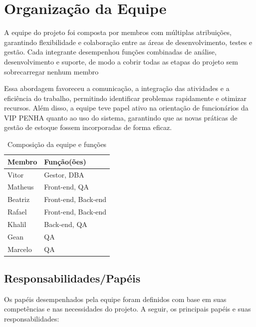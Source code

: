 \documentclass[
	12pt,				%
	openany,			%
	twoside,			%
	a4paper,			%
	english,			%
	brazil				%
	]{abntex2}
\begin{document}
\section{Organização da Equipe}

A equipe do projeto foi composta por membros com múltiplas atribuições, garantindo flexibilidade e colaboração entre as áreas de desenvolvimento, testes e gestão. Cada integrante desempenhou funções combinadas de análise, desenvolvimento e suporte, de modo a cobrir todas as etapas do projeto sem sobrecarregar nenhum membro

Essa abordagem favoreceu a comunicação, a integração das atividades e a eficiência do trabalho, permitindo identificar problemas rapidamente e otimizar recursos. Além disso, a equipe teve papel ativo na orientação de funcionários da VIP PENHA quanto ao uso do sistema, garantindo que as novas práticas de gestão de estoque fossem incorporadas de forma eficaz.

\begin{table}[htbp] 
\centering
\begin{tabular}{|l|l|}
\hline
\textbf{Membro} & \textbf{Função(ões)} \\ \hline
Vitor           & Gestor, DBA         \\ \hline
Matheus         & Front-end, QA         \\ \hline
Beatriz         & Front-end, Back-end   \\ \hline
Rafael          & Front-end, Back-end         \\ \hline
Khalil              & Back-end, QA          \\ \hline
Gean            & QA                    \\ \hline
Marcelo         & QA         \\ \hline
\end{tabular}
\caption{Composição da equipe e funções}
\end{table}


\subsection{Responsabilidades/Papéis}

Os papéis desempenhados pela equipe foram definidos com base em suas competências e nas necessidades do projeto. A seguir, os principais papéis e suas responsabilidades:
\end{document}
